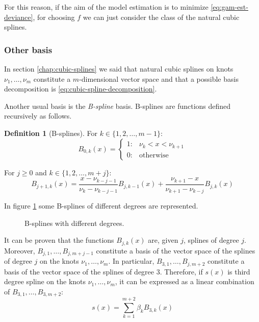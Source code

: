 \documentclass[a4paper, twoside, openright, 12pt]{report}
\theoremstyle{definition}
\newtheorem{definition}{Definition}[chapter]
\theoremstyle{definition}
\theoremstyle{definition}
\theoremstyle{remark}
\begin{document}
For this reason, if the aim of the model estimation is to minimize \eqref{eq:gam-est-deviance}, for choosing \(f\) we can just consider the class of the natural cubic splines.

\hypertarget{other-basis}{%
\subsubsection{Other basis}\label{other-basis}}

In section \ref{chap:cubic-splines} we said that natural cubic splines on knots \(\nu_1, \dots, \nu_m\) constitute a \(m\)-dimensional vector space and that a possible basis decomposition is \eqref{eq:cubic-spline-decomposition}.

Another usual basis is the \emph{B-spline} basis. B-splines are functions defined recursively as follows.

\begin{definition}[B-splines]
\label{def:b-splines} \iffalse (B-splines) \fi{} For \(k\in\{1,2,\dots,m-1\}\):
\[
B_{0,k}(x) = 
\begin{cases}
1: & \nu_k < x < \nu_{k+1} \\
0: & \text{otherwise}
\end{cases}
\]

For \(j \ge 0\) and \(k\in\{1,2,\dots,m+j\}\):
\[
B_{j+1,k}(x) = 
\frac{x-\nu_{k-j-1}}{\nu_{k}-\nu_{k-j-1}} B_{j,k-1}(x)
+ \frac{\nu_{k+1}-x}{\nu_{k+1}-\nu_{k-j}} B_{j,k}(x)
\]
\end{definition}

In figure \ref{fig:b-splines-plot} some B-splines of different degrees are represented.





\begin{figure}[!hbtp]

{\centering {}

}

\caption{B-splines with different degrees.}\label{fig:b-splines-plot}
\end{figure}

It can be proven that the functions \(B_{j,k}(x)\) are, given \(j\), splines of degree \(j\). Moreover, \(B_{j,1}, \dots, B_{j,m+j-1}\) constitute a basis of the vector space of the splines of degree \(j\) on the knots \(\nu_1, \dots, \nu_m\). In particular, \(B_{3,1}, \dots, B_{j,m+2}\) constitute a basis of the vector space of the splines of degree \(3\). Therefore, if \(s(x)\) is third degree spline on the knots \(\nu_1, \dots, \nu_m\), it can be expressed as a linear combination of \(B_{3,1}, \dots, B_{3,m+2}\):
\[
s(x) = \sum_{k=1}^{m+2}{\beta_{k}B_{3,k}(x)}
\]
\end{document}
